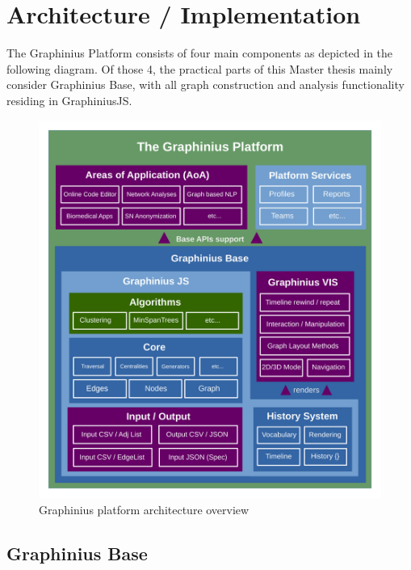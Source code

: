 
\chapter{Architecture / Implementation}
\label{ch:implementation}

The Graphinius Platform consists of four main components as depicted in the following diagram. Of those 4, the practical parts of this Master thesis mainly consider Graphinius Base, with all graph construction and analysis functionality residing in GraphiniusJS. 

\begin{figure}[H]
	\centering
	\hspace*{-0.5cm}
	\includegraphics[width=1.05\textwidth]{figures/Graphinius_Architecture_new}
	\caption{Graphinius platform architecture overview}
	\label{fig_graphinius_architecture}
\end{figure}


\section{Graphinius Base}
\label{sect:graphinius_base}

